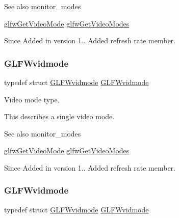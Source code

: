 \begin{DoxySeeAlso}{See also}
monitor\+\_\+modes 

\hyperlink{group__monitor_ga21f7f60de4f4d0fa360c7ad159b75c9e}{glfw\+Get\+Video\+Mode} \hyperlink{group__monitor_ga7eaea6132f15e9b5d47eb94f88547f79}{glfw\+Get\+Video\+Modes}
\end{DoxySeeAlso}
\begin{DoxySince}{Since}
Added in version 1..  Added refresh rate member. 
\end{DoxySince}
\mbox{\label{group__monitor_gae48aadf4ea0967e6605c8f58fa5daccb}} 
\subsubsection{\texorpdfstring{G\+L\+F\+Wvidmode}{GLFWvidmode}\hspace{0.1cm}{\footnotesize\ttfamily [2/5]}}
{\footnotesize\ttfamily typedef struct \hyperlink{structGLFWvidmode}{G\+L\+F\+Wvidmode}  \hyperlink{structGLFWvidmode}{G\+L\+F\+Wvidmode}}



Video mode type. 

This describes a single video mode.

\begin{DoxySeeAlso}{See also}
monitor\+\_\+modes 

\hyperlink{group__monitor_ga21f7f60de4f4d0fa360c7ad159b75c9e}{glfw\+Get\+Video\+Mode} \hyperlink{group__monitor_ga7eaea6132f15e9b5d47eb94f88547f79}{glfw\+Get\+Video\+Modes}
\end{DoxySeeAlso}
\begin{DoxySince}{Since}
Added in version 1..  Added refresh rate member. 
\end{DoxySince}
\mbox{\label{group__monitor_gae48aadf4ea0967e6605c8f58fa5daccb}} 
\subsubsection{\texorpdfstring{G\+L\+F\+Wvidmode}{GLFWvidmode}\hspace{0.1cm}{\footnotesize\ttfamily [3/5]}}
{\footnotesize\ttfamily typedef struct \hyperlink{structGLFWvidmode}{G\+L\+F\+Wvidmode}  \hyperlink{structGLFWvidmode}{G\+L\+F\+Wvidmode}}



